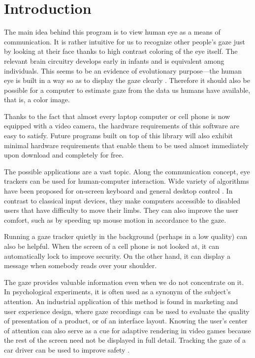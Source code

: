 \chapter{Introduction}

The main idea behind this program is to view human eye as a means of communication.
It is rather intuitive for us to recognize other people's gaze just by looking at their face thanks to high contrast coloring of the eye itself.
The relevant brain circuitry develops early in infants and is equivalent among individuals.
This seems to be an evidence of evolutionary purpose---the human eye is built in a way so as to display the gaze clearly \cite{tomasello07}.
Therefore it should also be possible for a computer to estimate gaze from the data us humans have available, that is, a color image.

Thanks to the fact that almost every laptop computer or cell phone is now equipped with a video camera, the hardware requirements of this software are easy to satisfy.
Future programs built on top of this library will also exhibit minimal hardware requirements that enable them to be used almost immediately upon download and completely for free.

The possible applications are a vast topic.
Along the communication concept, eye trackers can be used for human-computer interaction.
Wide variety of algorithms have been proposed for on-screen keyboard and general desktop control \cite{majaranta02}.
In contrast to classical input devices, they make computers accessible to disabled users that have difficulty to move their limbs.
They can also improve the user comfort, such as by speeding up mouse motion in accordance to the gaze.

Running a gaze tracker quietly in the background (perhaps in a low quality) can also be helpful.
When the screen of a cell phone is not looked at, it can automatically lock to improve security.
On the other hand, it can display a message when somebody reads over your shoulder.

The gaze provides valuable information even when we do not concentrate on it.
In psychological experiments, it is often used as a synonym of the subject's attention.
An industrial application of this method is found in marketing and user experience design, where gaze recordings can be used to evaluate the quality of presentation of a product, or of an interface layout.
Knowing the user's center of attention can also serve as a cue for adaptive rendering in video games because the rest of the screen need not be displayed in full detail.
Tracking the gaze of a car driver can be used to improve safety \cite{murphy-chutorian07}.

